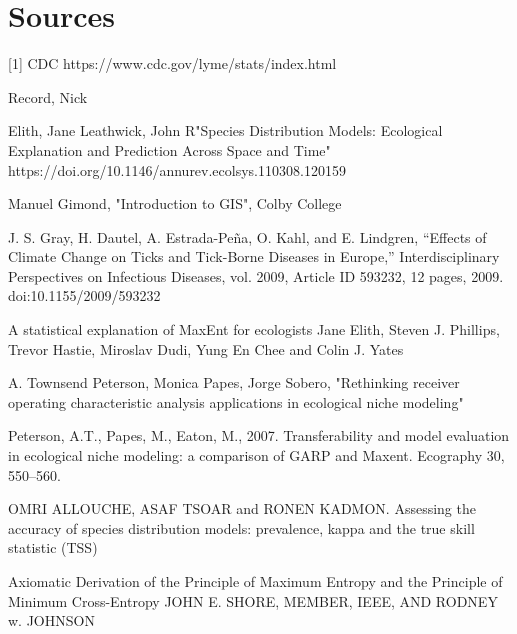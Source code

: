 
\chapter{Sources} %
[1] CDC https://www.cdc.gov/lyme/stats/index.html \newline

\noindent [2] Record, Nick \newline

\noindent [3] Elith, Jane Leathwick, John R"Species Distribution Models: Ecological Explanation and Prediction Across Space and Time" https://doi.org/10.1146/annurev.ecolsys.110308.120159\newline

\noindent [4] Manuel Gimond, "Introduction to GIS", Colby College \newline

\noindent [5] J. S. Gray, H. Dautel, A. Estrada-Peña, O. Kahl, and E. Lindgren, “Effects of Climate Change on Ticks and Tick-Borne Diseases in Europe,” Interdisciplinary Perspectives on Infectious Diseases, vol. 2009, Article ID 593232, 12 pages, 2009. doi:10.1155/2009/593232\newline

\noindent [6] A statistical explanation of MaxEnt for ecologists Jane Elith, Steven J. Phillips, Trevor Hastie, Miroslav Dudi, Yung En Chee and Colin J. Yates\newline

\noindent [7] A. Townsend Peterson, Monica Papes, Jorge Sobero, "Rethinking receiver operating characteristic analysis applications in ecological niche modeling" \newline

\noindent [8] Peterson, A.T., Papes, M., Eaton, M., 2007. Transferability and model evaluation in ecological niche modeling: a comparison of GARP and Maxent. Ecography 30, 550–560. \newline

\noindent [9] OMRI ALLOUCHE, ASAF TSOAR and RONEN KADMON. Assessing the accuracy of species distribution models: prevalence, kappa and the true skill statistic (TSS) \newline

\noindent [10]  Axiomatic Derivation of the Principle of Maximum Entropy and the Principle of Minimum Cross-Entropy JOHN E. SHORE, MEMBER, IEEE, AND RODNEY w. JOHNSON \newline
    